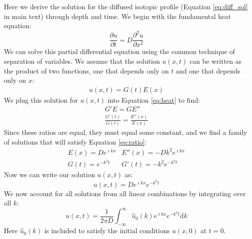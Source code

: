 \documentclass[draft, jgrga]{AGUTeX}
\begin{document}
\begin{article}
Here we derive the solution for the diffused isotopic profile (Equation \ref{eq:diff_sol} in main text) through depth and time. We begin with the fundamental heat equation:
\begin{equation}
  \label{eq:heat}
\frac{\partial u}{\partial t}
= D \frac{\partial ^2u}{\partial x^2}
\end{equation}
We can solve this partial differential equation using the common technique of separation of variables. We assume that the solution \begin{math} u(x,t) \end{math} can be written as the product of two functions, one that depends only on \begin{math} t \end{math} and one that depends only on \begin{math} x \end{math}:
\begin{eqnarray*}
u(x,t) = G(t)E(x)
\end{eqnarray*}
We plug this solution for $u(x,t)$ into Equation \ref{eq:heat} to find:
\begin{eqnarray}
G'E = GE'' \\
\frac{G'(t)}{G(t)} = \frac{E''(x)}{E(x)} \label{eq:ratio}
\end{eqnarray}
Since these ratios are equal, they must equal some constant, and we find a family of solutions that will satisfy Equation \ref{eq:ratio}:
\begin{eqnarray}
E(x) = De^{\imath kx} & E''(x) = -Dk^2e^{\imath kx} \\
G(t) = e^{-k^2t} & G'(t) = -k^2 e^{-k^2t} \nonumber
\end{eqnarray}
Now we can write our solution $u(x,t)$ as:
\begin{equation}
u(x,t) = De^{\imath kx}e^{-k^2t}
\end{equation}
We now account for all solutions from all linear combinations by integrating over all $k$:
\begin{equation}
u(x,t) = \frac{1}{2 \pi D}
\int^\infty_{-\infty} \hat{u}_0 (k) e^{\imath kx} e^{-k^2t} \mathrm{d}k
\end{equation}
Here \begin{math}  \hat{u}_0 (k) \end{math} is included to satisfy the initial conditions \begin{math} u(x,0) \end{math} at \begin{math} t=0 \end{math}.\\

\end{article}
\end{document}
